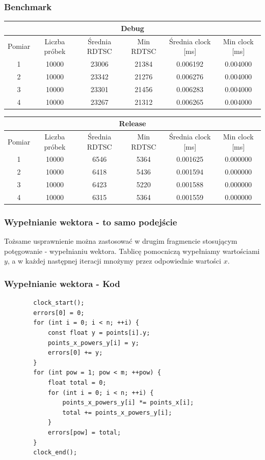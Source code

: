 \documentclass{article}
\begin{document}
	\subsubsection{Benchmark}
	\begin{center}
		\begin{tabular}{|c|c|c|c|c|c|} \hline
			\multicolumn{6}{|c|}{Debug} \\\hline
			Pomiar  & Liczba próbek & Średnia RDTSC & Min RDTSC & Średnia clock [ms] & Min clock [ms] \\\hline
			\hline
			1 & 10000 & 23006 & 21384 & 0.006192 & 0.004000 \\\hline
			2 & 10000 & 23342 & 21276 & 0.006276 & 0.004000 \\\hline
			3 & 10000 & 23301 & 21456 & 0.006283 & 0.004000 \\\hline
			4 & 10000 & 23267 & 21312 & 0.006265 & 0.004000 \\\hline
			
		\end{tabular}
	\end{center}
	\begin{center}
		\begin{tabular}{|c|c|c|c|c|c|} \hline
			\multicolumn{6}{|c|}{Release} \\\hline
			Pomiar  & Liczba próbek & Średnia RDTSC & Min RDTSC & Średnia clock [ms] & Min clock [ms] \\\hline
			\hline
			1 & 10000 & 6546 & 5364 & 0.001625 & 0.000000 \\\hline
			2 & 10000 & 6418 & 5436 & 0.001594 & 0.000000 \\\hline
			3 & 10000 & 6423 & 5220 & 0.001588 & 0.000000 \\\hline
			4 & 10000 & 6315 & 5364 & 0.001559 & 0.000000 \\\hline
			
		\end{tabular}
	\end{center}
	
	\subsubsection{Wypełnianie wektora - to samo podejście}
	Tożsame usprawnienie można zastosować w drugim fragmencie stosującym potęgowanie - wypełnianiu wektora. Tablicę pomocniczą wypełniamy wartościami $y$, a w każdej następnej iteracji mnożymy przez odpowiednie wartości $x$.
	
	\subsubsection{Wypełnianie wektora - Kod}
	\begin{verbatim}
		clock_start();
		errors[0] = 0;
		for (int i = 0; i < n; ++i) {
			const float y = points[i].y;
			points_x_powers_y[i] = y;
			errors[0] += y;
		}
		for (int pow = 1; pow < m; ++pow) {
			float total = 0;
			for (int i = 0; i < n; ++i) {
				points_x_powers_y[i] *= points_x[i];
				total += points_x_powers_y[i];
			}
			errors[pow] = total;
		}
		clock_end();
	\end{verbatim}
	
\end{document}
